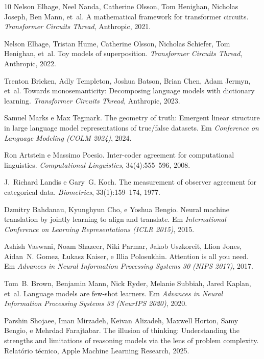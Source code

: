 \documentclass[12pt,a4paper]{article}
\begin{document}
\begin{thebibliography}{10}
Nelson Elhage, Neel Nanda, Catherine Olsson, Tom Henighan, Nicholas Joseph,
  Ben Mann, et~al.
\newblock A mathematical framework for transformer circuits.
\newblock \emph{Transformer Circuits Thread}, Anthropic, 2021.

Nelson Elhage, Tristan Hume, Catherine Olsson, Nicholas Schiefer, Tom
  Henighan, et~al.
\newblock Toy models of superposition.
\newblock \emph{Transformer Circuits Thread}, Anthropic, 2022.

Trenton Bricken, Adly Templeton, Joshua Batson, Brian Chen, Adam Jermyn,
  et~al.
\newblock Towards monosemanticity: Decomposing language models with
  dictionary learning.
\newblock \emph{Transformer Circuits Thread}, Anthropic, 2023.

Samuel Marks e Max Tegmark.
\newblock The geometry of truth: Emergent linear structure in large language
  model representations of true/false datasets.
\newblock Em \emph{Conference on Language Modeling (COLM 2024)}, 2024.

Ron Artstein e Massimo Poesio.
\newblock Inter-coder agreement for computational linguistics.
\newblock \emph{Computational Linguistics}, 34(4):555--596, 2008.

J.~Richard Landis e Gary~G. Koch.
\newblock The measurement of observer agreement for categorical data.
\newblock \emph{Biometrics}, 33(1):159--174, 1977.

Dzmitry Bahdanau, Kyunghyun Cho, e Yoshua Bengio.
\newblock Neural machine translation by jointly learning to align and
  translate.
\newblock Em \emph{International Conference on Learning Representations (ICLR
  2015)}, 2015.

Ashish Vaswani, Noam Shazeer, Niki Parmar, Jakob Uszkoreit, Llion Jones,
  Aidan~N. Gomez, {\L}ukasz Kaiser, e Illia Polosukhin.
\newblock Attention is all you need.
\newblock Em \emph{Advances in Neural Information Processing Systems 30 (NIPS
  2017)}, 2017.

Tom~B. Brown, Benjamin Mann, Nick Ryder, Melanie Subbiah, Jared Kaplan, et~al.
\newblock Language models are few-shot learners.
\newblock Em \emph{Advances in Neural Information Processing Systems 33
  (NeurIPS 2020)}, 2020.

Parshin Shojaee, Iman Mirzadeh, Keivan Alizadeh, Maxwell Horton, Samy Bengio,
  e Mehrdad Farajtabar.
\newblock The illusion of thinking: Understanding the strengths and
  limitations of reasoning models via the lens of problem complexity.
\newblock Relatório técnico, Apple Machine Learning Research, 2025.


\end{thebibliography}
\end{document}
